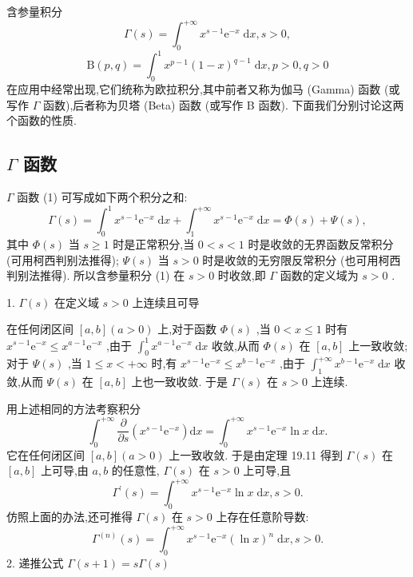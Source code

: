 含参量积分
\[
\Gamma \left( s\right)  = {\int }_{0}^{+\infty }{x}^{s - 1}{\mathrm{e}}^{-x}\mathrm{\;d}x,s > 0, \tag{1}
\]
\[
\mathrm{B}\left( {p,q}\right)  = {\int }_{0}^{1}{x}^{p - 1}{\left( 1 - x\right) }^{q - 1}\mathrm{\;d}x,p > 0,q > 0 \tag{2}
\]
在应用中经常出现,它们统称为欧拉积分,其中前者又称为伽马 (Gamma) 函数 (或写作 \(\Gamma\) 函数),后者称为贝塔 (Beta) 函数 (或写作 B 函数). 下面我们分别讨论这两个函数的性质.

\subsection{ \(\Gamma\) 函数}

\(\Gamma\) 函数 (1) 可写成如下两个积分之和:
\[
\Gamma \left( s\right)  = {\int }_{0}^{1}{x}^{s - 1}{\mathrm{e}}^{-x}\mathrm{\;d}x + {\int }_{1}^{+\infty }{x}^{s - 1}{\mathrm{e}}^{-x}\mathrm{\;d}x = \Phi \left( s\right)  + \Psi \left( s\right) ,
\]
其中 \(\Phi \left( s\right)\) 当 \(s \geq  1\) 时是正常积分,当 \(0 < s < 1\) 时是收敛的无界函数反常积分 (可用柯西判别法推得); \(\Psi \left( s\right)\) 当 \(s > 0\) 时是收敛的无穷限反常积分 (也可用柯西判别法推得). 所以含参量积分 (1) 在 \(s > 0\) 时收敛,即 \(\Gamma\) 函数的定义域为 \(s > 0\) .

1. \(\Gamma \left( s\right)\) 在定义域 \(s > 0\) 上连续且可导

在任何闭区间 \(\left\lbrack  {a,b}\right\rbrack  \left( {a > 0}\right)\) 上,对于函数 \(\Phi \left( s\right)\) ,当 \(0 < x \leq  1\) 时有 \({x}^{s - 1}{\mathrm{e}}^{-x} \leq  {x}^{a - 1}{\mathrm{e}}^{-x}\) ,由于 \({\int }_{0}^{1}{x}^{a - 1}{\mathrm{e}}^{-x}\mathrm{\;d}x\) 收敛,从而 \(\Phi \left( s\right)\) 在 \(\left\lbrack  {a,b}\right\rbrack\) 上一致收敛; 对于 \(\Psi \left( s\right)\) ,当 \(1 \leq  x <  + \infty\) 时,有 \({x}^{s - 1}{\mathrm{e}}^{-x} \leq  {x}^{b - 1}{\mathrm{e}}^{-x}\) ,由于 \({\int }_{1}^{+\infty }{x}^{b - 1}{\mathrm{e}}^{-x}\mathrm{\;d}x\) 收敛,从而 \(\Psi \left( s\right)\) 在 \(\left\lbrack  {a,b}\right\rbrack\) 上也一致收敛. 于是 \(\Gamma \left( s\right)\) 在 \(s > 0\) 上连续.

用上述相同的方法考察积分
\[
{\int }_{0}^{+\infty }\frac{\partial }{\partial s}\left( {{x}^{s - 1}{\mathrm{e}}^{-x}}\right) \mathrm{d}x = {\int }_{0}^{+\infty }{x}^{s - 1}{\mathrm{e}}^{-x}\ln x\mathrm{\;d}x.
\]
它在任何闭区间 \(\left\lbrack  {a,b}\right\rbrack  \left( {a > 0}\right)\) 上一致收敛. 于是由定理 19.11 得到 \(\Gamma \left( s\right)\) 在 \(\left\lbrack  {a,b}\right\rbrack\) 上可导,由 \(a,b\) 的任意性, \(\Gamma \left( s\right)\) 在 \(s > 0\) 上可导,且
\[
{\Gamma }^{\prime }\left( s\right)  = {\int }_{0}^{+\infty }{x}^{s - 1}{\mathrm{e}}^{-x}\ln x\mathrm{\;d}x,s > 0.
\]
仿照上面的办法,还可推得 \(\Gamma \left( s\right)\) 在 \(s > 0\) 上存在任意阶导数:
\[
{\Gamma }^{\left( n\right) }\left( s\right)  = {\int }_{0}^{+\infty }{x}^{s - 1}{\mathrm{e}}^{-x}{\left( \ln x\right) }^{n}\mathrm{\;d}x,s > 0.
\]
2. 递推公式 \(\Gamma \left( {s + 1}\right)  = {s\Gamma }\left( s\right)\)

